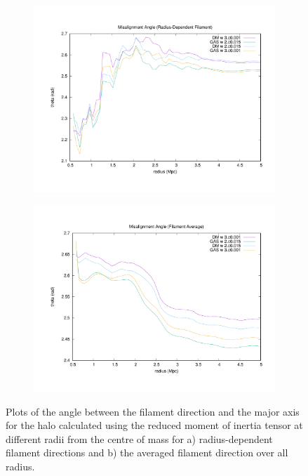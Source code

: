 \documentclass[journal]{IEEEtran}
\begin{document}
\begin{figure}[b]
\centering
	\begin{subfigure}[t]{0.45\textwidth}
		\centering
		\includegraphics[width=\linewidth]{MisRad}
	\end{subfigure}
	\quad
	\begin{subfigure}[t]{0.45\textwidth}
		\centering
		\includegraphics[width=\linewidth]{MisAve}
	\end{subfigure}
\label{fig:angleplots}
	\caption{Plots of the angle between the filament direction and the major axis for the halo calculated using the reduced moment of inertia tensor at different radii from the centre of mass for a) radius-dependent filament directions and b) the averaged filament direction over all radius.}
\end{figure}
\end{document}
